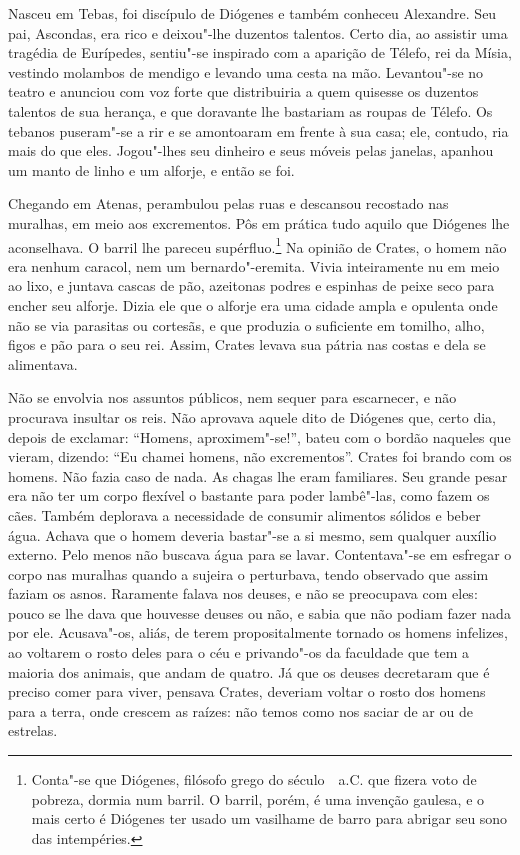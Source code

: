Nasceu em Tebas, foi discípulo de Diógenes e também conheceu Alexandre. Seu
pai, Ascondas, era rico e deixou"-lhe duzentos talentos. Certo dia, ao
assistir uma tragédia de Eurípedes, sentiu"-se inspirado com a aparição de
Télefo, rei da Mísia, vestindo molambos de mendigo e levando uma cesta na
mão. Levantou"-se no teatro e anunciou com voz forte que distribuiria a
quem quisesse os duzentos talentos de sua herança, e que doravante lhe
bastariam as roupas de Télefo. Os tebanos puseram"-se a rir e se amontoaram
em frente à sua casa; ele, contudo, ria mais do que eles. Jogou"-lhes seu
dinheiro e seus móveis pelas janelas, apanhou um manto de linho e um
alforje, e então se foi.

Chegando em Atenas, perambulou pelas ruas e descansou recostado nas
muralhas, em meio aos excrementos. Pôs em prática tudo aquilo que Diógenes
lhe aconselhava. O barril lhe pareceu supérfluo.\footnote{ Conta"-se que
Diógenes, filósofo grego do século~~a.C. que fizera voto de pobreza,
dormia num barril. O barril, porém, é uma invenção gaulesa, e o mais certo
é Diógenes ter usado um vasilhame de barro para abrigar seu sono das intempéries.} 
Na opinião de Crates, o homem não era nenhum
caracol, nem um bernardo"-eremita. Vivia inteiramente nu em meio ao lixo, e
juntava cascas de pão, azeitonas podres e espinhas de peixe seco para
encher seu alforje. Dizia ele que o alforje era uma cidade ampla e
opulenta onde não se via parasitas ou cortesãs, e que produzia o
suficiente em tomilho, alho, figos e pão para o seu rei. Assim, Crates
levava sua pátria nas costas e dela se alimentava.

Não se envolvia nos assuntos públicos, nem sequer para escarnecer, e não
procurava insultar os reis. Não aprovava aquele dito de Diógenes que,
certo dia, depois de exclamar: “Homens, aproximem"-se!”, bateu com o bordão
naqueles que vieram, dizendo: “Eu chamei homens, não excrementos”. Crates
foi brando com os homens. Não fazia caso de nada. As chagas lhe eram
familiares. Seu grande pesar era não ter um corpo flexível o bastante para
poder lambê"-las, como fazem os cães. Também deplorava a necessidade de
consumir alimentos sólidos e beber água. Achava que o homem deveria
bastar"-se a si mesmo, sem qualquer auxílio externo. Pelo menos não buscava
água para se lavar. Contentava"-se em esfregar o corpo nas muralhas quando
a sujeira o perturbava, tendo observado que assim faziam os asnos.
Raramente falava nos deuses, e não se preocupava com eles: pouco se lhe
dava que houvesse deuses ou não, e sabia que não podiam fazer nada por
ele. Acusava"-os, aliás, de terem propositalmente tornado os homens
infelizes, ao voltarem o rosto deles para o céu e privando"-os da faculdade
que tem a maioria dos animais, que andam de quatro. Já que os deuses
decretaram que é preciso comer para viver, pensava Crates, deveriam voltar
o rosto dos homens para a terra, onde crescem as raízes: não temos como
nos saciar de ar ou de estrelas.

